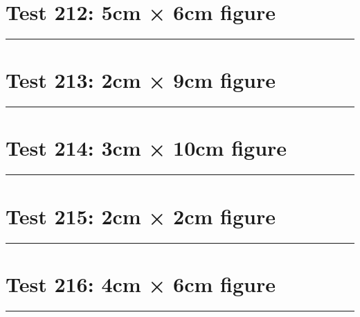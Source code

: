 \documentclass[a4paper,11pt]{article}
\begin{document}
\section*{Test 212: 5cm × 6cm figure}
\begin{swarmwrap}%
  \begin{minipage}[t]{5cm}
    \centering
    \rule{\linewidth}{6cm}
  \end{minipage}%
\end{swarmwrap}%
\swarmwrapnext
\lipsum[114]
\lipsum[115]
\lipsum[116]
\lipsum[117]
\lipsum[118]
\section*{Test 213: 2cm × 9cm figure}
\begin{swarmwrap}%
  \begin{minipage}[t]{2cm}
    \centering
    \rule{\linewidth}{9cm}
  \end{minipage}%
\end{swarmwrap}%
\swarmwrapnext
\lipsum[105]
\lipsum[106]
\lipsum[107]
\lipsum[108]
\lipsum[109]
\section*{Test 214: 3cm × 10cm figure}
\begin{swarmwrap}%
  \begin{minipage}[t]{3cm}
    \centering
    \rule{\linewidth}{10cm}
  \end{minipage}%
\end{swarmwrap}%
\swarmwrapnext
\lipsum[114]
\lipsum[115]
\lipsum[116]
\lipsum[117]
\lipsum[118]
\lipsum[119]
\section*{Test 215: 2cm × 2cm figure}
\begin{swarmwrap}%
  \begin{minipage}[t]{2cm}
    \centering
    \rule{\linewidth}{2cm}
  \end{minipage}%
\end{swarmwrap}%
\swarmwrapnext
\lipsum[84]
\lipsum[85]
\lipsum[86]
\lipsum[87]
\lipsum[88]
\lipsum[89]
\section*{Test 216: 4cm × 6cm figure}
\begin{swarmwrap}%
  \begin{minipage}[t]{4cm}
    \centering
    \rule{\linewidth}{6cm}
  \end{minipage}%
\end{swarmwrap}%
\swarmwrapnext
\lipsum[25]
\lipsum[26]
\lipsum[27]
\end{document}

